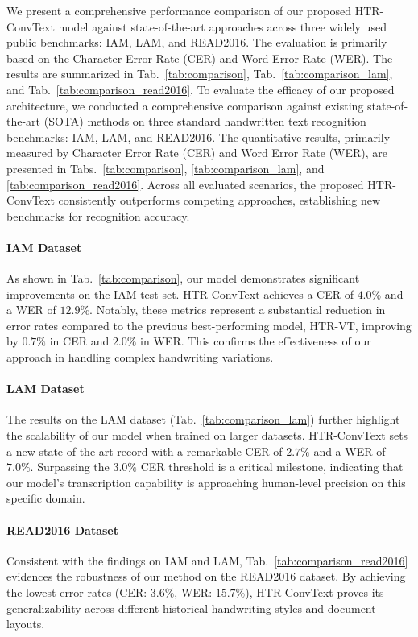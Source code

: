 \documentclass[final,5p,times]{elsarticle}
\begin{document}
We present a comprehensive performance comparison of our proposed HTR-ConvText model against state-of-the-art approaches across three widely used public benchmarks: IAM, LAM, and READ2016.
The evaluation is primarily based on the Character Error Rate (CER) and Word Error Rate (WER).
The results are summarized in Tab.~\ref{tab:comparison}, Tab.~\ref{tab:comparison_lam}, and Tab.~\ref{tab:comparison_read2016}.
To evaluate the efficacy of our proposed architecture, we conducted a comprehensive comparison against existing state-of-the-art (SOTA) methods on three standard handwritten text recognition benchmarks: IAM, LAM, and READ2016.
The quantitative results, primarily measured by Character Error Rate (CER) and Word Error Rate (WER), are presented in Tabs.~\ref{tab:comparison}, \ref{tab:comparison_lam}, and \ref{tab:comparison_read2016}.
Across all evaluated scenarios, the proposed HTR-ConvText consistently outperforms competing approaches, establishing new benchmarks for recognition accuracy.
\paragraph{IAM Dataset}
As shown in Tab.~\ref{tab:comparison}, our model demonstrates significant improvements on the IAM test set.
HTR-ConvText achieves a CER of $4.0\%$ and a WER of $12.9\%$.
Notably, these metrics represent a substantial reduction in error rates compared to the previous best-performing model, HTR-VT, improving by $0.7\%$ in CER and $2.0\%$ in WER.
This confirms the effectiveness of our approach in handling complex handwriting variations.
\paragraph{LAM Dataset}
The results on the LAM dataset (Tab.~\ref{tab:comparison_lam}) further highlight the scalability of our model when trained on larger datasets.
HTR-ConvText sets a new state-of-the-art record with a remarkable CER of $2.7\%$ and a WER of $7.0\%$.
Surpassing the $3.0\%$ CER threshold is a critical milestone, indicating that our model's transcription capability is approaching human-level precision on this specific domain.
\paragraph{READ2016 Dataset}
Consistent with the findings on IAM and LAM, Tab.~\ref{tab:comparison_read2016} evidences the robustness of our method on the READ2016 dataset.
By achieving the lowest error rates (CER: $3.6\%$, WER: $15.7\%$), HTR-ConvText proves its generalizability across different historical handwriting styles and document layouts.
\end{document}
